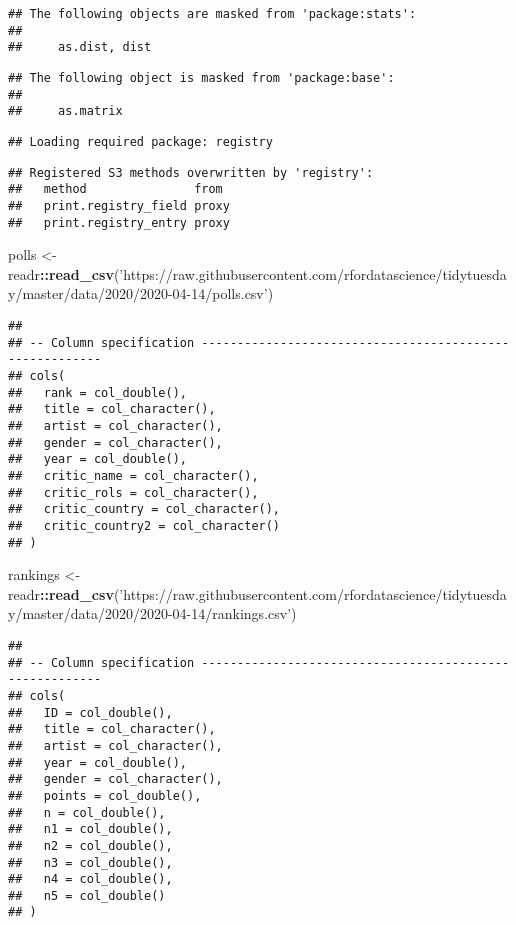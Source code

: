\documentclass[
]{article}
\newenvironment{Shaded}{\begin{snugshade}}{\end{snugshade}}
\newcommand{\KeywordTok}[1]{\textcolor[rgb]{0.13,0.29,0.53}{\textbf{#1}}}
\newcommand{\NormalTok}[1]{#1}
\newcommand{\OperatorTok}[1]{\textcolor[rgb]{0.81,0.36,0.00}{\textbf{#1}}}
\newcommand{\StringTok}[1]{\textcolor[rgb]{0.31,0.60,0.02}{#1}}
\begin{document}
\begin{verbatim}
## The following objects are masked from 'package:stats':
## 
##     as.dist, dist
\end{verbatim}

\begin{verbatim}
## The following object is masked from 'package:base':
## 
##     as.matrix
\end{verbatim}

\begin{verbatim}
## Loading required package: registry
\end{verbatim}

\begin{verbatim}
## Registered S3 methods overwritten by 'registry':
##   method               from 
##   print.registry_field proxy
##   print.registry_entry proxy
\end{verbatim}

\begin{Shaded}
\begin{Highlighting}[]
\NormalTok{polls <-}\StringTok{ }\NormalTok{readr}\OperatorTok{::}\KeywordTok{read_csv}\NormalTok{(}\StringTok{'https://raw.githubusercontent.com/rfordatascience/tidytuesday/master/data/2020/2020-04-14/polls.csv'}\NormalTok{)}
\end{Highlighting}
\end{Shaded}

\begin{verbatim}
## 
## -- Column specification --------------------------------------------------------
## cols(
##   rank = col_double(),
##   title = col_character(),
##   artist = col_character(),
##   gender = col_character(),
##   year = col_double(),
##   critic_name = col_character(),
##   critic_rols = col_character(),
##   critic_country = col_character(),
##   critic_country2 = col_character()
## )
\end{verbatim}

\begin{Shaded}
\begin{Highlighting}[]
\NormalTok{rankings <-}\StringTok{ }\NormalTok{readr}\OperatorTok{::}\KeywordTok{read_csv}\NormalTok{(}\StringTok{'https://raw.githubusercontent.com/rfordatascience/tidytuesday/master/data/2020/2020-04-14/rankings.csv'}\NormalTok{)}
\end{Highlighting}
\end{Shaded}

\begin{verbatim}
## 
## -- Column specification --------------------------------------------------------
## cols(
##   ID = col_double(),
##   title = col_character(),
##   artist = col_character(),
##   year = col_double(),
##   gender = col_character(),
##   points = col_double(),
##   n = col_double(),
##   n1 = col_double(),
##   n2 = col_double(),
##   n3 = col_double(),
##   n4 = col_double(),
##   n5 = col_double()
## )
\end{verbatim}
\end{document}
